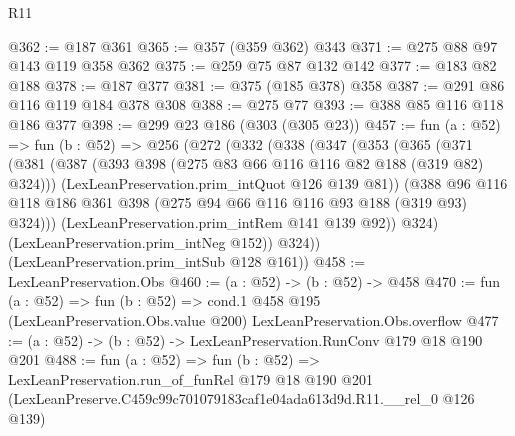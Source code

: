 \begin{lexlean}{R11}
\begin{coremodule}
@362 := @187 @361
@365 := @357 (@359 @362) @343
@371 := @275 @88 @97 @143 @119 @358 @362
@375 := @259 @75 @87 @132 @142
@377 := @183 @82 @188
@378 := @187 @377
@381 := @375 (@185 @378) @358
@387 := @291 @86 @116 @119 @184 @378 @308
@388 := @275 @77
@393 := @388 @85 @116 @118 @186 @377
@398 := @299 @23 @186 (@303 (@305 @23))
@457 := fun (a : @52) =>
  fun (b : @52) =>
  @256
    (@272
      (@332
        (@338
          (@347
            (@353
              (@365
                (@371
                  (@381
                    (@387 (@393 @398 (@275 @83 @66 @116 @116 @82 @188 (@319 @82) @324)))
                    (LexLeanPreservation.prim_intQuot @126 @139 @81))
                  (@388
                    @96
                    @116
                    @118
                    @186
                    @361
                    @398
                    (@275 @94 @66 @116 @116 @93 @188 (@319 @93) @324)))
                (LexLeanPreservation.prim_intRem @141 @139 @92))
              @324)
            (LexLeanPreservation.prim_intNeg @152))
          @324))
      (LexLeanPreservation.prim_intSub @128 @161))
@458 := LexLeanPreservation.Obs
@460 := (a : @52) -> (b : @52) -> @458
@470 := fun (a : @52) =>
  fun (b : @52) =>
  cond.{1} @458 @195 (LexLeanPreservation.Obs.value @200) LexLeanPreservation.Obs.overflow
@477 := (a : @52) -> (b : @52) -> LexLeanPreservation.RunConv @179 @18 @190 @201
@488 := fun (a : @52) =>
  fun (b : @52) =>
  LexLeanPreservation.run_of_funRel
    @179
    @18
    @190
    @201
    (LexLeanPreserve.C459c99c701079183caf1e04ada613d9d.R11.__rel_0 @126 @139)
\end{coremodule}
\end{lexlean}
